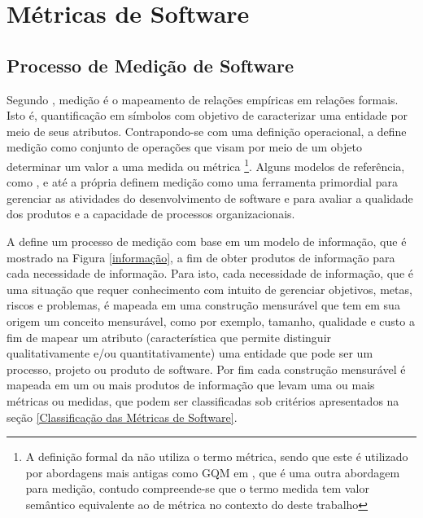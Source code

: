 \chapter{Métricas de Software}

\section{Processo de Medição de Software}

Segundo , medição é o mapeamento de relações empíricas em relações formais. Isto é, quantificação em símbolos com objetivo de caracterizar uma entidade por meio de seus atributos. Contrapondo-se com uma  definição operacional, a  define medição como conjunto de operações que visam por meio de um objeto determinar um valor a uma medida ou métrica \footnote{A definição formal da  não utiliza o termo métrica, sendo que este é utilizado por abordagens mais antigas como GQM em , que é uma outra abordagem para medição, contudo compreende-se que o termo medida tem valor semântico equivalente ao de métrica no contexto do deste trabalho}. Alguns modelos de referência, como , e até a própria  definem medição como uma ferramenta primordial para gerenciar as atividades do desenvolvimento de software e para avaliar a qualidade dos produtos e a capacidade de processos organizacionais. 


A  define um processo de medição com base em um modelo de
informação, que é mostrado na Figura \ref{informação}, a fim de obter produtos de informação para cada necessidade de informação. Para isto, cada necessidade de informação, que é uma situação que requer conhecimento com intuito de  gerenciar objetivos, metas, riscos e problemas, é mapeada em uma construção  mensurável que tem em sua origem um conceito mensurável, como por exemplo,  tamanho, qualidade e custo a fim de mapear um atributo (característica  que permite distinguir qualitativamente e/ou quantitativamente) uma entidade que pode ser um processo, projeto ou produto de software. Por fim  cada construção mensurável é mapeada em um ou mais produtos de informação que  levam uma ou mais métricas ou medidas, que podem ser classificadas sob  critérios apresentados na seção \ref{Classificação das Métricas de Software}.

